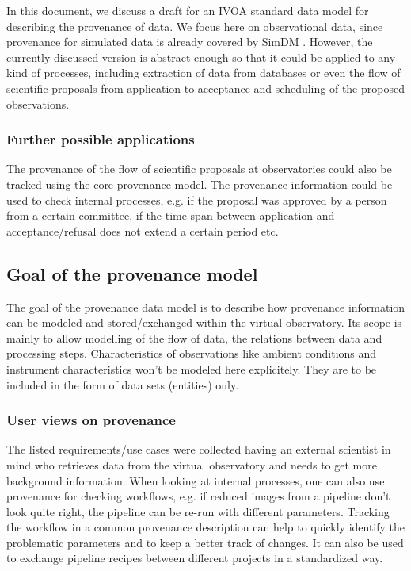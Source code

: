 In this document, we discuss a draft for an IVOA standard data model for describing the
provenance of data. We focus here on observational data, since provenance for
simulated data is already covered by SimDM 
\cite{std:SimDM}. However, the currently discussed version is abstract enough so that 
it could be applied to any kind of processes, including extraction of data from 
databases or even the flow of scientific proposals from application to 
acceptance and scheduling of the proposed observations.

\subsubsection{Further possible applications}

The provenance of the flow of scientific proposals at observatories could also be tracked using the core provenance model. The provenance information could be used to check internal processes, e.g. if the proposal was approved by a person from a certain committee, if the time span between application and acceptance/refusal does not extend a certain period etc. 


\subsection{Goal of the provenance model}
The goal of the provenance data model is to describe how provenance information can be modeled and stored/exchanged within the virtual observatory. Its scope is mainly to allow modelling of the flow of data, the relations between data and processing steps. Characteristics of observations like ambient conditions and instrument characteristics won't be modeled here explicitely. They are to be included in the form of data sets (entities) only.

\subsubsection{User views on provenance}\label{sec:userviews}

The listed requirements/use cases were collected having an external scientist in mind who retrieves data from the virtual observatory and needs to get more background information. When looking at internal processes, one can also use provenance for checking workflows, e.g. if reduced images from a pipeline don't look quite right, the pipeline can be re-run with different parameters. Tracking the workflow in a common provenance description can help to quickly identify the problematic parameters and to keep a better track of changes. It can also be used to exchange pipeline recipes between different projects in a standardized way.

